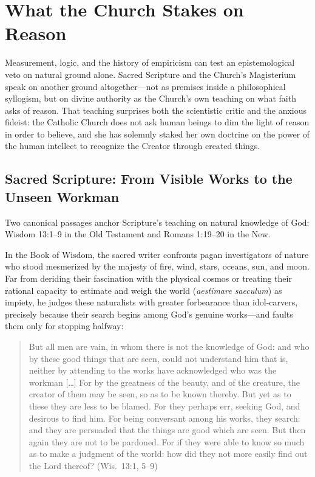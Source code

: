 \section{What the Church Stakes on Reason}

Measurement, logic, and the history of empiricism can test an epistemological veto on natural ground alone. Sacred Scripture and the Church's Magisterium speak on another ground altogether---not as premises inside a philosophical syllogism, but on divine authority as the Church's own teaching on what faith asks of reason. That teaching surprises both the scientistic critic and the anxious fideist: the Catholic Church does not ask human beings to dim the light of reason in order to believe, and she has solemnly staked her own doctrine on the power of the human intellect to recognize the Creator through created things.

\subsection{Sacred Scripture: From Visible Works to the Unseen Workman}

Two canonical passages anchor Scripture's teaching on natural knowledge of God: Wisdom 13:1--9 in the Old Testament and Romans 1:19--20 in the New.

In the Book of Wisdom, the sacred writer confronts pagan investigators of nature who stood mesmerized by the majesty of fire, wind, stars, oceans, sun, and moon. Far from deriding their fascination with the physical cosmos or treating their rational capacity to estimate and weigh the world (\emph{aestimare saeculum}) as impiety, he judges these naturalists with greater forbearance than idol-carvers, precisely because their search begins among God's genuine works---and faults them only for stopping halfway:

\begin{quote}
But all men are vain, in whom there is not the knowledge of God: and who by these good things that are seen, could not understand him that is, neither by attending to the works have acknowledged who was the workman [\ldots] For by the greatness of the beauty, and of the creature, the creator of them may be seen, so as to be known thereby. But yet as to these they are less to be blamed. For they perhaps err, seeking God, and desirous to find him. For being conversant among his works, they search: and they are persuaded that the things are good which are seen. But then again they are not to be pardoned. For if they were able to know so much as to make a judgment of the world: how did they not more easily find out the Lord thereof? (Wis.\ 13:1, 5--9)
\end{quote}

